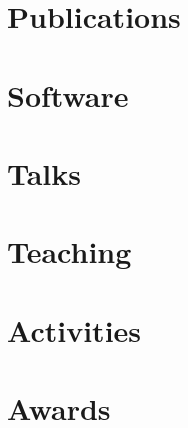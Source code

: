 \documentclass[margin,line]{res}
\begin{document}
\begin{resume}
\section{\sc Publications}




\section{\sc Software}



\section{\sc Talks}



\section{\sc Teaching}



\section{\sc Activities}




\section{\sc Awards}



\end{resume}
\end{document}
